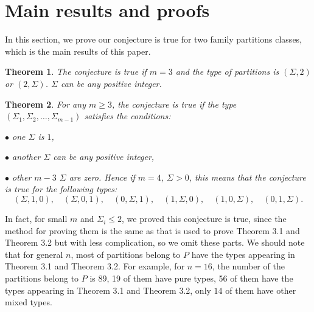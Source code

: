 \documentclass[draft]{amsart}
\numberwithin{equation}{section}
\theoremstyle{plain}
\newtheorem{theorem}{Theorem}[section]
\theoremstyle{remark}
\begin{document}









\section{ Main results and proofs}
In this section, we prove our conjecture is true for two family partitions classes, which is the main results of this paper.
\begin{theorem}
The conjecture is true if $m=3$ and the type of partitions is $(\Sigma, 2)$ or $(2, \Sigma)$. $\Sigma$ can be any positive 
integer.
\end{theorem}
\begin{theorem}
For any $m\geq 3$, the conjecture is true if the type $(\Sigma_{1}, \Sigma_{2}, \dots, \Sigma_{m-1})$ satisfies the conditions:

$\bullet$ one $\Sigma$ is $1$,

$\bullet$ another $\Sigma$ can be any positive integer,

$\bullet$ other $m-3$ $\Sigma$ are zero.
Hence if $m=4$, $\Sigma>0$, this means that the conjecture is true for the following types:
$$
(\Sigma, 1, 0),\quad(\Sigma, 0, 1),\quad(0, \Sigma, 1),\quad(1, \Sigma, 0),\quad(1, 0,  \Sigma),\quad(0, 1,  \Sigma).
$$
\end{theorem}
In fact, for small $m$ and $\Sigma_{i}\leq 2$, we proved this conjecture is true, since the method for proving them
is the same as that is used to prove Theorem 3.1 and Theorem 3.2 but with less complication, so we omit these parts.
We should note that for general $n$,  most of partitions belong to $P$ have the types appearing in Theorem 3.1 and Theorem 3.2. For example, for $n=16$, the number of the partitions belong to $P$ is $89$, 19 of them have pure types, 56 of them have the types appearing in Theorem 3.1 and Theorem 3.2, only $14$ of them have other mixed types.
\end{document}
